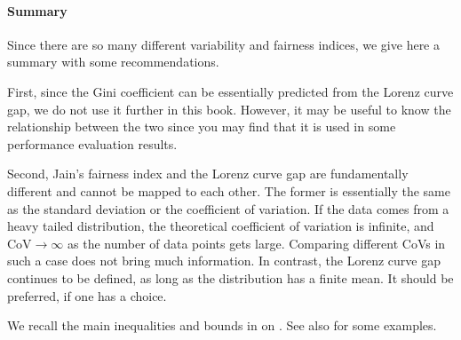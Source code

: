 \paragraph{Summary}
Since there are so many different variability and
fairness indices, we give here a summary with
some recommendations.

First, since the Gini coefficient can be essentially predicted
from the Lorenz curve gap, we do not use it further in this
book. However, it may be useful to know the relationship
between the two since you may find that it is used in some
performance evaluation results.

Second, Jain's fairness index and the Lorenz curve gap are
fundamentally different and cannot be mapped to each other. The
former is essentially the same as the standard deviation or the
coefficient of variation. If the data comes from a heavy tailed
distribution, the theoretical coefficient of variation is
infinite, and $\mbox{CoV}\to \infty$ as the number of data
points gets large. Comparing different CoVs in such a case does
not bring much information. In contrast, the Lorenz curve gap
continues to be defined, as long as the distribution has a
finite mean. It should be preferred, if one has a choice.

We recall the main inequalities and bounds in
 on .
See also  for some examples.

